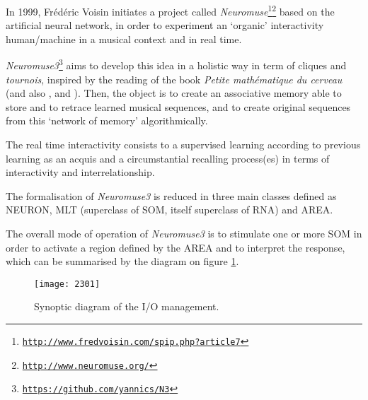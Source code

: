 In 1999, Frédéric Voisin initiates a project called \textsl{Neuromuse}\footnote{\href{http://www.fredvoisin.com/spip.php?article7}{\texttt{\scriptsize http://www.fredvoisin.com/spip.php?article7}}}\footnote{\href{http://www.neuromuse.org/}{\texttt{\scriptsize http://www.neuromuse.org/}}} based on the artificial neural network, in order to experiment an `organic' interactivity human/machine in a musical context and in real time.

\bigskip

\textsl{Neuromuse3}\footnote{\href{https://github.com/yannics/N3}{\texttt{\scriptsize https://github.com/yannics/N3}}} aims to develop this idea in a holistic way in term of cliques and \textit{tournois}, inspired by the reading of the book \textit{Petite mathématique du cerveau} \citep{bg1} (and also \citep{bg2}, \citep{bg3} and \citep{bg4}).
Then, the object is to create an associative memory able to store and to retrace learned musical sequences, and to create original sequences from this `network of memory' algorithmically.

The real time interactivity consists to a supervised learning according to previous learning as an acquis and a circumstantial recalling process(es) in terms of interactivity and interrelationship.

\bigskip

The formalisation of \textsl{Neuromuse3} is reduced in three main classes defined as NEURON, MLT (superclass of SOM, itself superclass of RNA) and AREA.

The overall mode of operation of \textsl{Neuromuse3} is to stimulate one or more SOM in order to activate a region defined by the AREA and to interpret the response, which can be summarised by the diagram on figure \ref{fig:io}.

\begin{figure}[htbp]
\begin{center}
\texttt{[image: 2301]}
\caption{Synoptic diagram of the I/O management. 
}
\label{fig:io}
\end{center}
\end{figure}